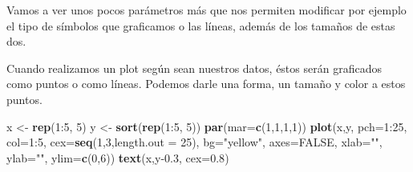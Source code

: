 \documentclass[]{article}
\newenvironment{Shaded}{\begin{snugshade}}{\end{snugshade}}
\newcommand{\KeywordTok}[1]{\textcolor[rgb]{0.13,0.29,0.53}{\textbf{{#1}}}}
\newcommand{\DataTypeTok}[1]{\textcolor[rgb]{0.13,0.29,0.53}{{#1}}}
\newcommand{\DecValTok}[1]{\textcolor[rgb]{0.00,0.00,0.81}{{#1}}}
\newcommand{\FloatTok}[1]{\textcolor[rgb]{0.00,0.00,0.81}{{#1}}}
\newcommand{\StringTok}[1]{\textcolor[rgb]{0.31,0.60,0.02}{{#1}}}
\newcommand{\OtherTok}[1]{\textcolor[rgb]{0.56,0.35,0.01}{{#1}}}
\newcommand{\NormalTok}[1]{{#1}}
\begin{document}
Vamos a ver unos pocos parámetros más que nos permiten modificar por
ejemplo el tipo de símbolos que graficamos o las líneas, además de los
tamaños de estas dos.

Cuando realizamos un plot según sean nuestros datos, éstos serán
graficados como puntos o como líneas. Podemos darle una forma, un tamaño
y color a estos puntos.

\begin{Shaded}
\begin{Highlighting}[]
\NormalTok{x <-}\StringTok{ }\KeywordTok{rep}\NormalTok{(}\DecValTok{1}\NormalTok{:}\DecValTok{5}\NormalTok{, }\DecValTok{5}\NormalTok{)}
\NormalTok{y <-}\StringTok{ }\KeywordTok{sort}\NormalTok{(}\KeywordTok{rep}\NormalTok{(}\DecValTok{1}\NormalTok{:}\DecValTok{5}\NormalTok{, }\DecValTok{5}\NormalTok{))}
\KeywordTok{par}\NormalTok{(}\DataTypeTok{mar=}\KeywordTok{c}\NormalTok{(}\DecValTok{1}\NormalTok{,}\DecValTok{1}\NormalTok{,}\DecValTok{1}\NormalTok{,}\DecValTok{1}\NormalTok{))}
\KeywordTok{plot}\NormalTok{(x,y, }\DataTypeTok{pch=}\DecValTok{1}\NormalTok{:}\DecValTok{25}\NormalTok{, }\DataTypeTok{col=}\DecValTok{1}\NormalTok{:}\DecValTok{5}\NormalTok{, }\DataTypeTok{cex=}\KeywordTok{seq}\NormalTok{(}\DecValTok{1}\NormalTok{,}\DecValTok{3}\NormalTok{,}\DataTypeTok{length.out =} \DecValTok{25}\NormalTok{), }\DataTypeTok{bg=}\StringTok{"yellow"}\NormalTok{,}
     \DataTypeTok{axes=}\OtherTok{FALSE}\NormalTok{, }\DataTypeTok{xlab=}\StringTok{""}\NormalTok{, }\DataTypeTok{ylab=}\StringTok{""}\NormalTok{, }\DataTypeTok{ylim=}\KeywordTok{c}\NormalTok{(}\DecValTok{0}\NormalTok{,}\DecValTok{6}\NormalTok{))}
\KeywordTok{text}\NormalTok{(x,y}\FloatTok{-0.3}\NormalTok{, }\DataTypeTok{cex=}\FloatTok{0.8}\NormalTok{)}
\end{Highlighting}
\end{Shaded}
\end{document}
